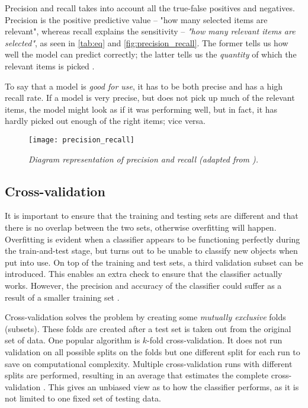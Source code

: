 Precision and recall takes into account all the true-false positives and negatives. Precision is the positive predictive value -- "how many selected items are relevant", whereas recall explains the sensitivity -- \textit{"how many relevant items are selected"}, as seen in \autoref{tab:eq} and \autoref{fig:precision_recall}. The former tells us how well the model can predict correctly; the latter tells us the \textit{quantity} of which the relevant items is picked \cite{precision-recall-wiki}.

To say that a model is \textit{good for use}, it has to be both precise and has a high recall rate. If a model is very precise, but does not pick up much of the relevant items, the model might look as if it was performing well, but in fact, it has hardly picked out enough of the right items; vice versa.

\begin{figure}[h]
  \centering
  \texttt{[image: precision\_recall]}
  \caption{\textit{ Diagram representation of precision and recall (adapted from \protect{}). }}
  \label{fig:precision_recall}
\end{figure}

\subsection{Cross-validation}
It is important to ensure that the training and testing sets are different and that there is no overlap between the two sets, otherwise overfitting will happen. Overfitting is evident when a classifier appears to be functioning perfectly during the train-and-test stage, but turns out to be unable to classify new objects when put into use. On top of the training and test sets, a third validation subset can be introduced. This enables an extra check to ensure that the classifier actually works.  However, the precision and accuracy of the classifier could suffer as a result of a smaller training set \cite{cross-val-scikit}. 

Cross-validation solves the problem by creating some \textit{mutually exclusive} folds (subsets). These folds are created after a test set is taken out from the original set of data. One popular algorithm is $k$-fold cross-validation. It does not run validation on all possible splits on the folds but one different split for each run to save on computational complexity. Multiple cross-validation runs with different splits are performed, resulting in an average that estimates the complete cross-validation \cite{cross-val-kohavi}. This gives an unbiased view as to how the classifier performs, as it is not limited to one fixed set of testing data.

